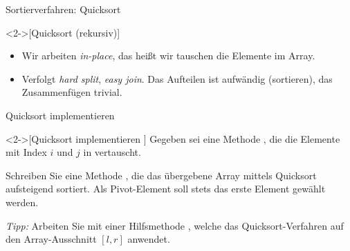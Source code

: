 \begin{frame}{Sortierverfahren: Quicksort}
    \begin{definition}<2->[Quicksort \hfill{}(rekursiv)]
    \end{definition}
    \begin{itemize}
        \item<6-> Wir arbeiten \emph{in-place}, das heißt wir tauschen die Elemente im Array.
        \item<7-> Verfolgt \emph{hard split}, \emph{easy join}. Das Aufteilen ist aufwändig (sortieren), das Zusammenfügen trivial.
    \end{itemize}
    \vfill
    \begin{center}
    \end{center}
\end{frame}

\ifull
\begin{frame}[c]{Quicksort implementieren}
    \begin{exercise}<2->[Quicksort implementieren ]
        \pause{}Gegeben sei eine Methode , die die Elemente mit Index \(i\) und \(j\) in  vertauscht.\medskip\par\pause Schreiben Sie eine Methode , die das übergebene Array mittels Quicksort aufsteigend sortiert. Als Pivot-Element soll stets das erste Element gewählt werden.\medskip\par\pause{}\textit{Tipp:} Arbeiten Sie mit einer Hilfsmethode , welche das Quicksort-Verfahren auf den Array-Ausschnitt \([l, r]\) anwendet.
    \end{exercise}
\end{frame}

